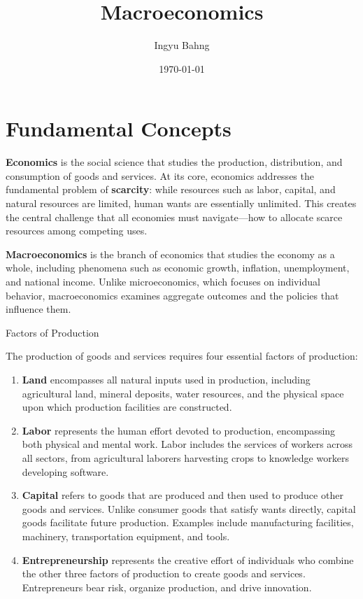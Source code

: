 \documentclass[10pt]{article}
\title{Macroeconomics}
\date{\today}
\author{Ingyu Bahng}
\begin{document}


\section{Fundamental Concepts} 

  \textbf{Economics} is the social science that studies the production, distribution, and consumption of goods and services. At its core, economics addresses the fundamental problem of \textbf{scarcity}: while resources such as labor, capital, and natural resources are limited, human wants are essentially unlimited. This creates the central challenge that all economies must navigate---how to allocate scarce resources among competing uses. 

  \textbf{Macroeconomics} is the branch of economics that studies the economy as a whole, including phenomena such as economic growth, inflation, unemployment, and national income. Unlike microeconomics, which focuses on individual behavior, macroeconomics examines aggregate outcomes and the policies that influence them.

  \begin{core}{Factors of Production} 

    The production of goods and services requires four essential factors of production: 

    \begin{enumerate}

      \item \textbf{Land} encompasses all natural inputs used in production, including agricultural land, mineral deposits, water resources, and the physical space upon which production facilities are constructed.

      \item \textbf{Labor} represents the human effort devoted to production, encompassing both physical and mental work. Labor includes the services of workers across all sectors, from agricultural laborers harvesting crops to knowledge workers developing software.

      \item \textbf{Capital} refers to goods that are produced and then used to produce other goods and services. Unlike consumer goods that satisfy wants directly, capital goods facilitate future production. Examples include manufacturing facilities, machinery, transportation equipment, and tools.

      \item \textbf{Entrepreneurship} represents the creative effort of individuals who combine the other three factors of production to create goods and services. Entrepreneurs bear risk, organize production, and drive innovation.

    \end{enumerate}

  \end{core}
\end{document}
